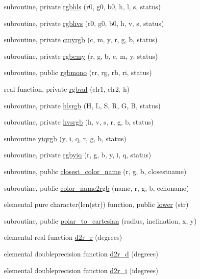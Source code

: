 \begin{DoxyCompactItemize}
\item 
subroutine, private \mbox{\hyperlink{namespacem__pixel_a02bb73b68aeae5056ccf76868146b1b4}{rgbhls}} (r0, g0, b0, h, l, s, status)
\item 
subroutine, private \mbox{\hyperlink{namespacem__pixel_a07ffb197bdcd075f5375e95b43c18915}{rgbhvs}} (r0, g0, b0, h, v, s, status)
\item 
subroutine, private \mbox{\hyperlink{namespacem__pixel_a98c49513d301803bb2c5cd28b8ccdba3}{cmyrgb}} (c, m, y, r, g, b, status)
\item 
subroutine, private \mbox{\hyperlink{namespacem__pixel_a4dd5383ae0616511d16c996903a971dc}{rgbcmy}} (r, g, b, c, m, y, status)
\item 
subroutine, public \mbox{\hyperlink{namespacem__pixel_a63a581cda811571c9ded805516f9d709}{rgbmono}} (rr, rg, rb, ri, status)
\item 
real function, private \mbox{\hyperlink{namespacem__pixel_a9f8175d7b5b349cd5c30a99100eef5c5}{rgbval}} (clr1, clr2, h)
\item 
subroutine, private \mbox{\hyperlink{namespacem__pixel_a854b4980c2694d7c33b2830a225eeca0}{hlsrgb}} (H, L, S, R, G, B, status)
\item 
subroutine, private \mbox{\hyperlink{namespacem__pixel_a6eda5641d5c42b51d9488bd7ea743744}{hvsrgb}} (h, v, s, r, g, b, status)
\item 
subroutine \mbox{\hyperlink{namespacem__pixel_a0f4f12a4a769b8827a79b44f333eca28}{yiqrgb}} (y, i, q, r, g, b, status)
\item 
subroutine, private \mbox{\hyperlink{namespacem__pixel_a0c025b24458dba5fb448f62cb10c7088}{rgbyiq}} (r, g, b, y, i, q, status)
\item 
subroutine, public \mbox{\hyperlink{namespacem__pixel_a8555eecec7e18106e8167e137cfe8424}{closest\+\_\+color\+\_\+name}} (r, g, b, closestname)
\item 
subroutine, public \mbox{\hyperlink{namespacem__pixel_aee26ac45961d4093d2e472fcb6e1887d}{color\+\_\+name2rgb}} (name, r, g, b, echoname)
\item 
elemental pure character(len(str)) function, public \mbox{\hyperlink{namespacem__pixel_a7b4934756a8325a19fee6653c4cbf6af}{lower}} (str)
\item 
subroutine, public \mbox{\hyperlink{namespacem__pixel_a5ee5c618d117b150b661e15517a3d408}{polar\+\_\+to\+\_\+cartesian}} (radius, inclination, x, y)
\item 
elemental real function \mbox{\hyperlink{namespacem__pixel_af1963e62c5cc06bfb042831d1c869dc1}{d2r\+\_\+r}} (degrees)
\item 
elemental doubleprecision function \mbox{\hyperlink{namespacem__pixel_a2ea42e55432274dec04fdc822e484cdb}{d2r\+\_\+d}} (degrees)
\item 
elemental doubleprecision function \mbox{\hyperlink{namespacem__pixel_a0ac7088105ca5334d0ca3f1e4ea16d65}{d2r\+\_\+i}} (idegrees)
\end{DoxyCompactItemize}
